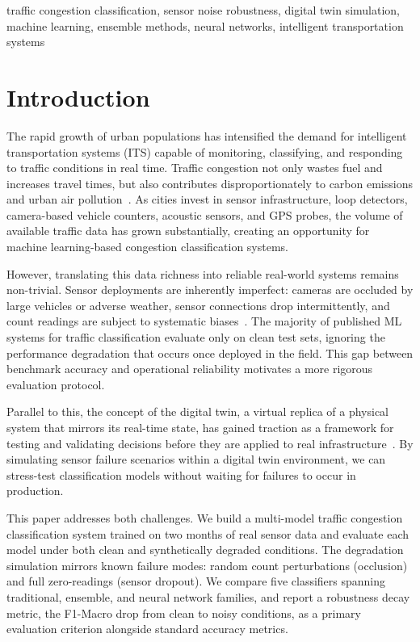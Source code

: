 \documentclass[conference,onecolumn,12pt]{IEEEtran}
\begin{document}
\begin{IEEEkeywords}
traffic congestion classification, sensor noise robustness, digital twin
simulation, machine learning, ensemble methods, neural networks, intelligent
transportation systems
\end{IEEEkeywords}

\section{Introduction}
\label{sec:intro}

The rapid growth of urban populations has intensified the demand for
intelligent transportation systems (ITS) capable of monitoring, classifying,
and responding to traffic conditions in real time. Traffic congestion not only
wastes fuel and increases travel times, but also contributes
disproportionately to carbon emissions and urban air
pollution~\cite{abdallah2026}. As cities invest in sensor
infrastructure, loop detectors, camera-based vehicle counters, acoustic
sensors, and GPS probes, the volume of available traffic data has grown
substantially, creating an opportunity for machine learning-based congestion
classification systems.

However, translating this data richness into reliable real-world systems
remains non-trivial. Sensor deployments are inherently imperfect: cameras are
occluded by large vehicles or adverse weather, sensor connections drop
intermittently, and count readings are subject to systematic
biases~\cite{xie2024,liu2024}. The majority of published ML systems for
traffic classification evaluate only on clean test sets, ignoring the
performance degradation that occurs once deployed in the field. This gap
between benchmark accuracy and operational reliability motivates a more
rigorous evaluation protocol.

Parallel to this, the concept of the digital twin, a virtual replica of a
physical system that mirrors its real-time state, has gained traction as a
framework for testing and validating decisions before they are applied to real
infrastructure~\cite{bagabaldo2025,kaewunruen2022}. By simulating sensor
failure scenarios within a digital twin environment, we can stress-test
classification models without waiting for failures to occur in production.

This paper addresses both challenges. We build a multi-model traffic
congestion classification system trained on two months of real sensor data and
evaluate each model under both clean and synthetically degraded conditions.
The degradation simulation mirrors known failure modes: random count
perturbations (occlusion) and full zero-readings (sensor dropout). We compare
five classifiers spanning traditional, ensemble, and neural network families,
and report a robustness decay metric, the F1-Macro drop from clean to noisy
conditions, as a primary evaluation criterion alongside standard accuracy
metrics.
\end{document}
